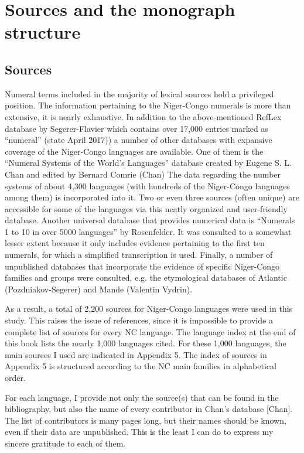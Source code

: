\section*{Sources and the monograph structure}

\subsection*{Sources}
Numeral terms included in the majority of lexical sources hold a privileged position. The information pertaining to the Niger-Congo numerals is more than extensive, it is nearly exhaustive. In addition to the above-mentioned RefLex database by Segerer-Flavier which contains over 17,000 entries marked as “numeral” (state  {April 2017)}) a number of other databases with expansive coverage of the Niger-Congo languages are available. One of them is the “Numeral Systems of the World's Languages” database created by Eugene S. L. Chan and edited by Bernard Comrie (Chan) The data regarding the number systems of about 4,300 languages (with hundreds of the Niger-Congo languages among them) is incorporated into it. Two or even three sources (often unique) are accessible for some of the languages via this neatly organized and user-friendly database. Another universal database that provides numerical data is “Numerals 1 to 10 in over 5000 languages” by Rosenfelder. It was consulted to a somewhat lesser extent because it only includes evidence pertaining to the first ten numerals, for which a simplified transcription is used. Finally, a number of unpublished databases that incorporate the evidence of specific Niger-Congo families and groups  were consulted, e.g. the etymological databases of Atlantic (Pozdniakov-Segerer) and Mande (Valentin Vydrin). 

As a result, a total of 2,200 sources for Niger-Congo languages were used in this study. This raises the issue of references, since it is impossible to provide a complete list of sources for every NC language. The language index at the end of this book lists the nearly 1,000 languages cited. For these 1,000 languages, the main sources I used are indicated in Appendix 5. The index of sources in Appendix 5 is structured according to the NC main families in alphabetical order. 

For each language, I provide not only the source(s) that can be found in the bibliography, but also the name of every contributor in Chan’s database [Chan]. The list of contributors is many pages long, but their names should be known, even if their data are unpublished. This is the least I can do to express my sincere gratitude to each of them.

